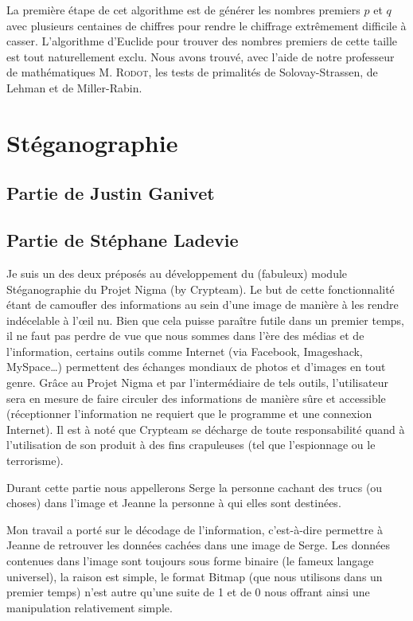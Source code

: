 \documentclass[a4paper,12pt]{article}
\begin{document}
La première étape de cet algorithme est de générer les nombres premiers $p$ et $q$ avec plusieurs centaines de chiffres pour rendre le chiffrage extrêmement difficile à casser. L'algorithme d'Euclide pour trouver des nombres premiers de cette taille est tout naturellement exclu. Nous avons trouvé, avec l'aide de notre professeur de mathématiques \textsc{M. Rodot}, les tests de primalités de Solovay-Strassen, de Lehman et de Miller-Rabin.

\newpage

\section{Stéganographie}

\subsection{Partie de Justin Ganivet}

\newpage

\subsection{Partie de Stéphane Ladevie}

Je suis un des deux préposés au développement du (fabuleux) module Stéganographie  du Projet Nigma (by Crypteam). Le but de cette fonctionnalité étant de camoufler des informations au sein d'une image de manière à les rendre indécelable à l'\oe{}il nu.
Bien que cela puisse paraître futile dans un premier temps, il ne faut pas perdre de vue que nous sommes dans l'ère des médias et de l'information, certains outils comme Internet (via Facebook, Imageshack, MySpace\dots{}) permettent des échanges mondiaux de photos et d'images en tout genre. Grâce au Projet Nigma et par l'intermédiaire de tels outils, l'utilisateur sera en mesure de faire circuler des informations de manière sûre et accessible (réceptionner l'information ne requiert que le programme et une connexion Internet). Il est à noté que Crypteam se décharge de toute responsabilité quand à l'utilisation de son produit à des fins crapuleuses (tel que l'espionnage ou le terrorisme).

Durant cette partie nous appellerons Serge la personne cachant des trucs (ou choses) dans l'image et Jeanne la personne à qui elles sont destinées.

Mon travail a porté sur le décodage de l'information, c'est-à-dire permettre à Jeanne de retrouver les données cachées dans une image de Serge. Les données contenues dans l'image sont toujours sous forme binaire (le fameux langage universel), la raison est simple, le format Bitmap (que nous utilisons dans un premier temps) n'est autre qu'une suite de 1 et de 0 nous offrant ainsi une manipulation relativement simple.
\end{document}
